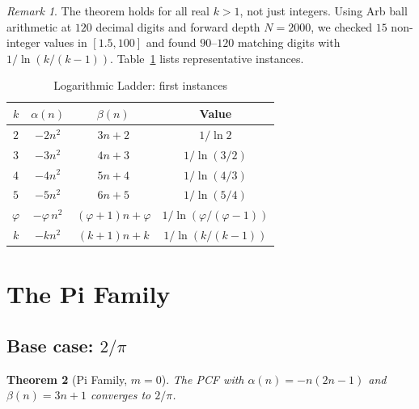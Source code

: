 \documentclass[11pt,a4paper]{article}
\theoremstyle{plain}
\newtheorem{theorem}{Theorem}[section]
\theoremstyle{definition}
\theoremstyle{remark}
\newtheorem{remark}[theorem]{Remark}
\begin{document}
\begin{remark}
The theorem holds for all real $k > 1$, not just integers.
Using Arb ball arithmetic at $120$ decimal digits and forward depth
$N=2000$, we checked $15$ non-integer values in $[1.5,100]$ and found
$90$--$120$ matching digits with $1/\ln(k/(k{-}1))$.
Table~\ref{tab:log} lists representative instances.
\end{remark}

\begin{table}[ht]
\centering
\caption{Logarithmic Ladder: first instances}\label{tab:log}
\begin{tabular}{@{}cccc@{}}
\toprule
$k$ & $\alpha(n)$ & $\beta(n)$ & Value \\
\midrule
$2$ & $-2n^2$ & $3n+2$ & $1/\ln 2$ \\
$3$ & $-3n^2$ & $4n+3$ & $1/\ln(3/2)$ \\
$4$ & $-4n^2$ & $5n+4$ & $1/\ln(4/3)$ \\
$5$ & $-5n^2$ & $6n+5$ & $1/\ln(5/4)$ \\
$\varphi$ & $-\varphi\, n^2$ & $(\varphi{+}1)n{+}\varphi$ &
  $1/\ln(\varphi/(\varphi{-}1))$ \\
$k$ & $-kn^2$ & $(k{+}1)n{+}k$ & $1/\ln(k/(k{-}1))$ \\
\bottomrule
\end{tabular}
\end{table}

\section{The Pi Family}\label{sec:pi}

\subsection{Base case: \texorpdfstring{$2/\pi$}{2/pi}}\label{sec:pi_base}

\begin{theorem}[Pi Family, $m=0$]\label{thm:pi0}
The PCF with $\alpha(n) = -n(2n{-}1)$ and $\beta(n) = 3n+1$
converges to $2/\pi$.
\end{theorem}
\end{document}
